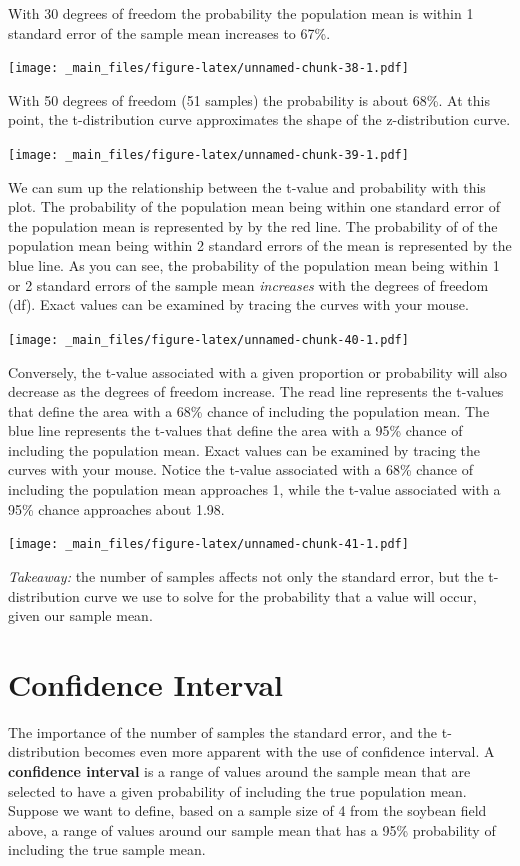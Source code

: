 \documentclass[
]{book}
\begin{document}
With 30 degrees of freedom the probability the population mean is within
1 standard error of the sample mean increases to 67\%.

\texttt{[image: \_main\_files/figure-latex/unnamed-chunk-38-1.pdf]}

With 50 degrees of freedom (51 samples) the probability is about 68\%. At
this point, the t-distribution curve approximates the shape of the
z-distribution curve.

\texttt{[image: \_main\_files/figure-latex/unnamed-chunk-39-1.pdf]}

We can sum up the relationship between the t-value and probability with
this plot. The probability of the population mean being within one
standard error of the population mean is represented by by the red line.
The probability of of the population mean being within 2 standard errors
of the mean is represented by the blue line. As you can see, the
probability of the population mean being within 1 or 2 standard errors
of the sample mean \emph{increases} with the degrees of freedom (df). Exact
values can be examined by tracing the curves with your mouse.

\texttt{[image: \_main\_files/figure-latex/unnamed-chunk-40-1.pdf]}

Conversely, the t-value associated with a given proportion or
probability will also decrease as the degrees of freedom increase. The
read line represents the t-values that define the area with a 68\% chance
of including the population mean. The blue line represents the t-values
that define the area with a 95\% chance of including the population mean.
Exact values can be examined by tracing the curves with your mouse.
Notice the t-value associated with a 68\% chance of including the
population mean approaches 1, while the t-value associated with a 95\%
chance approaches about 1.98.

\texttt{[image: \_main\_files/figure-latex/unnamed-chunk-41-1.pdf]}

\emph{Takeaway:} the number of samples affects not only the standard error,
but the t-distribution curve we use to solve for the probability that a
value will occur, given our sample mean.

\hypertarget{confidence-interval}{%
\section{Confidence Interval}\label{confidence-interval}}

The importance of the number of samples the standard error, and the
t-distribution becomes even more apparent with the use of confidence
interval. A \textbf{confidence interval} is a range of values around the
sample mean that are selected to have a given probability of including
the true population mean. Suppose we want to define, based on a sample
size of 4 from the soybean field above, a range of values around our
sample mean that has a 95\% probability of including the true sample
mean.
\end{document}
